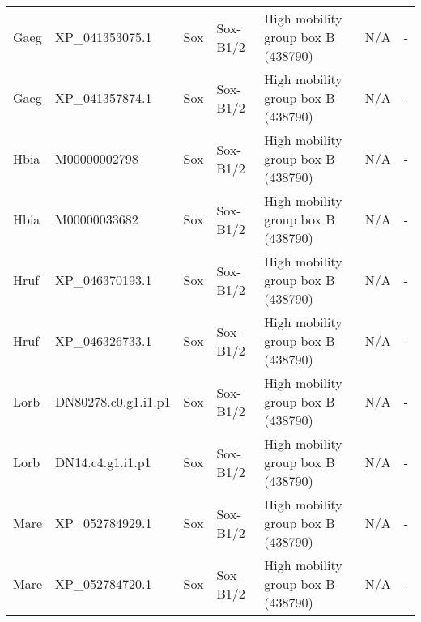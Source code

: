 \documentclass[../main.tex]{subfiles}
\begin{document}
\begin{landscape}
\begin{longtable}{lllllll}
		Gaeg           & XP\_041353075.1       & Sox            & Sox-B1/2            & High mobility group box B (438790)          & N/A                                                                    & -                    \\
		Gaeg           & XP\_041357874.1       & Sox            & Sox-B1/2            & High mobility group box B (438790)          & N/A                                                                    & -                    \\
		Hbia           & M00000002798          & Sox            & Sox-B1/2            & High mobility group box B (438790)          & N/A                                                                    & -                    \\
		Hbia           & M00000033682          & Sox            & Sox-B1/2            & High mobility group box B (438790)          & N/A                                                                    & -                    \\
		Hruf           & XP\_046370193.1       & Sox            & Sox-B1/2            & High mobility group box B (438790)          & N/A                                                                    & -                    \\
		Hruf           & XP\_046326733.1       & Sox            & Sox-B1/2            & High mobility group box B (438790)          & N/A                                                                    & -                    \\
		Lorb           & DN80278.c0.g1.i1.p1   & Sox            & Sox-B1/2            & High mobility group box B (438790)          & N/A                                                                    & -                    \\
		Lorb           & DN14.c4.g1.i1.p1      & Sox            & Sox-B1/2            & High mobility group box B (438790)          & N/A                                                                    & -                    \\
		Mare           & XP\_052784929.1       & Sox            & Sox-B1/2            & High mobility group box B (438790)          & N/A                                                                    & -                    \\
		Mare           & XP\_052784720.1       & Sox            & Sox-B1/2            & High mobility group box B (438790)          & N/A                                                                    & -                    \\

\end{longtable}
\end{landscape}
\end{document}
